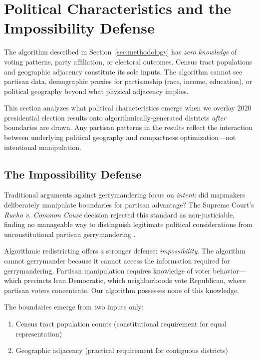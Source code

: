 \section{Political Characteristics and the Impossibility Defense}
\label{sec:analysis}

The algorithm described in Section~\ref{sec:methodology} has \textit{zero knowledge} of voting patterns, party affiliation, or electoral outcomes. Census tract populations and geographic adjacency constitute its sole inputs. The algorithm cannot see partisan data, demographic proxies for partisanship (race, income, education), or political geography beyond what physical adjacency implies.

This section analyzes what political characteristics emerge when we overlay 2020 presidential election results onto algorithmically-generated districts \textit{after} boundaries are drawn. Any partisan patterns in the results reflect the interaction between underlying political geography and compactness optimization—not intentional manipulation.

\subsection{The Impossibility Defense}

Traditional arguments against gerrymandering focus on \textit{intent}: did mapmakers deliberately manipulate boundaries for partisan advantage? The Supreme Court's \textit{Rucho v. Common Cause} decision rejected this standard as non-justiciable, finding no manageable way to distinguish legitimate political considerations from unconstitutional partisan gerrymandering \cite{rucho2019}.

Algorithmic redistricting offers a stronger defense: \textit{impossibility}. The algorithm cannot gerrymander because it cannot access the information required for gerrymandering. Partisan manipulation requires knowledge of voter behavior—which precincts lean Democratic, which neighborhoods vote Republican, where partisan voters concentrate. Our algorithm possesses none of this knowledge.

The boundaries emerge from two inputs only:
\begin{enumerate}
    \item Census tract population counts (constitutional requirement for equal representation)
    \item Geographic adjacency (practical requirement for contiguous districts)
\end{enumerate}

